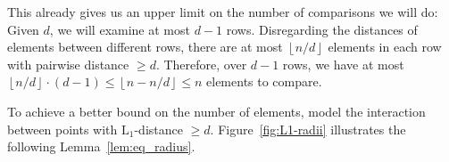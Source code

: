 \documentclass[a4paper,12pt,headsepline]{scrartcl}
\begin{document}
    This already gives us an upper limit on the number of comparisons we will do: Given $d$, we will examine at most $d-1$ rows.
    Disregarding the distances of elements between different rows, there are at most $\left \lfloor n/d \right \rfloor$ elements in each row with pairwise distance $\geq d$.
    Therefore, over $d-1$ rows, we have at most $\left \lfloor n/d \right \rfloor \cdot (d-1) \leq \left \lfloor n-n/d \right \rfloor \leq n$ elements to compare.

    To achieve a better bound on the number of elements, model the interaction between points with $\operatorname{L_1}$-distance $\geq d$. Figure~\ref{fig:L1-radii} illustrates the following Lemma~\ref{lem:eq_radius}.%
    
\end{document}
